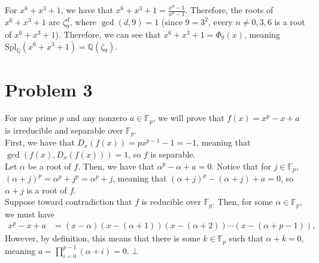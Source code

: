 \documentclass[11pt]{extarticle}
\newcommand{\Q}{\mathbb{Q}}
\begin{document}
  For $x^6 + x^3 + 1$, we have that $x^6 + x^3 + 1 = \frac{x^9-1}{x^3 - 1}$. Therefore, the roots of $x^6 + x^3 + 1$ are $\zeta_9^{d}$, where $\gcd(d,9) = 1$ (since $9 = 3^2$, every $n\neq 0,3,6$ is a root of $x^6 + x^3 + 1$). Therefore, we can see that $x^6 + x^3 + 1 = \Phi_{9}(x)$, meaning $\text{Spl}_{\Q}(x^6 + x^3 + 1) = \Q(\zeta_9)$.
  \section{Problem 3}%
  For any prime $p$ and any nonzero $a\in \mathbb{F}_{p}$, we will prove that $f(x) = x^p - x + a$ is irreducible and separable over $\mathbb{F}_p$.\\

  First, we have that $D_x(f(x)) = px^{p-1} - 1 = -1$, meaning that $\gcd(f(x),D_x(f(x))) = 1$, so $f$ is separable.\\

  Let $\alpha$ be a root of $f$. Then, we have that $\alpha^p - \alpha + a = 0$. Notice that for $j\in \mathbb{F}_p$, $(\alpha + j)^{p} = \alpha^p + j^p = \alpha^p + j$, meaning that $(\alpha + j)^{p} - (\alpha + j) + a = 0$, so $\alpha + j$ is a root of $f$.\\

  Suppose toward contradiction that $f$ is reducible over $\mathbb{F}_p$. Then, for some $\alpha \in \mathbb{F}_p$, we must have
  \begin{align*}
    x^p - x + a &= \left(x-\alpha\right)\left(x-(\alpha + 1)\right)\left(x-(\alpha + 2)\right)\cdots\left(x-(\alpha + p - 1)\right),
  \end{align*}
  However, by definition, this means that there is some $k\in \mathbb{F}_{p}$ such that $\alpha + k = 0$, meaning $ a = \prod_{i=0}^{p-1}(\alpha + i) = 0$. $\bot$
\end{document}
